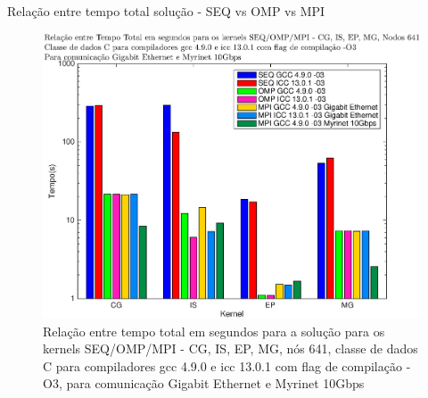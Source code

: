 \documentclass{beamer}
\begin{document}
\begin{frame}{Relação entre tempo total solução - SEQ vs OMP vs MPI }

\begin{figure}[H]
\centering
\includegraphics[width=0.75\columnwidth]{EPS/MPI/641/TIME_seq_vs_mpi_omp-gcc_vs_icc_641.eps}
\caption{\tiny Relação entre tempo total em segundos para a solução para os kernels SEQ/OMP/MPI - CG, IS, EP, MG, nós 641, classe de dados C para compiladores gcc 4.9.0 e icc 13.0.1 com flag de compilação  -O3, para comunicação Gigabit Ethernet e Myrinet 10Gbps}
\label{tempos_641}
\end{figure}

  \end{frame}
  
\end{document}
